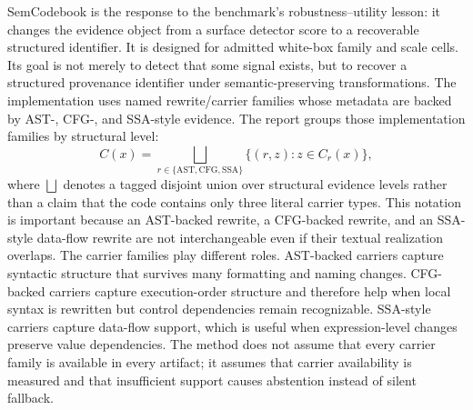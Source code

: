 SemCodebook is the response to the benchmark's robustness--utility lesson: it changes the evidence object from a surface detector score to a recoverable structured identifier. It is designed for admitted white-box family and scale cells. Its goal is not merely to detect that some signal exists, but to recover a structured provenance identifier under semantic-preserving transformations. The implementation uses named rewrite/carrier families whose metadata are backed by AST-, CFG-, and SSA-style evidence. The report groups those implementation families by structural level:
\begin{equation}
  C(x) =
  \bigsqcup_{r\in\{\mathrm{AST},\mathrm{CFG},\mathrm{SSA}\}}
  \{(r,z): z\in C_r(x)\},
  \label{eq:carrier-extraction}
\end{equation}
where $\bigsqcup$ denotes a tagged disjoint union over structural evidence levels rather than a claim that the code contains only three literal carrier types. This notation is important because an AST-backed rewrite, a CFG-backed rewrite, and an SSA-style data-flow rewrite are not interchangeable even if their textual realization overlaps.
The carrier families play different roles. AST-backed carriers capture syntactic structure that survives many formatting and naming changes. CFG-backed carriers capture execution-order structure and therefore help when local syntax is rewritten but control dependencies remain recognizable. SSA-style carriers capture data-flow support, which is useful when expression-level changes preserve value dependencies. The method does not assume that every carrier family is available in every artifact; it assumes that carrier availability is measured and that insufficient support causes abstention instead of silent fallback.

